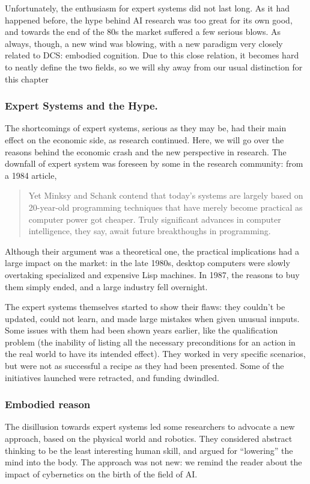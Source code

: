 \documentclass[../main.tex]{subfiles}
\begin{document}
Unfortunately, the enthusiasm for expert systems did not last long. As it had happened before, the hype behind AI research was too great for its own good, and towards the end of the 80s the market suffered a few serious blows. As always, though, a new wind was blowing, with a new paradigm very closely related to DCS: embodied cognition. Due to this close relation, it becomes hard to neatly define the two fields, so we will shy away from our usual distinction for this chapter

\subsubsection{Expert Systems and the Hype.}
The shortcomings of expert systems, serious as they may be, had their main effect on the economic side, as research continued. Here, we will go over the reasons behind the economic crash and the new perspective in research. The downfall of expert system was foreseen by some in the research community: from a 1984 article\cite{universityWhyComputersCan1984},
\begin{quote}
    Yet Minksy and Schank contend that today's systems are largely based on 20-year-old programming techniques that have merely become practical as computer power got cheaper. Truly significant advances in computer intelligence, they say, await future breakthoughs in programming.
\end{quote}

Although their argument was a theoretical one, the practical implications had a large impact on the market: in the late 1980s, desktop computers were slowly overtaking specialized and expensive Lisp machines. In 1987, the reasons to buy them simply ended, and a large industry fell overnight.

The expert systems themselves started to show their flaws: they couldn't be updated, could not learn, and made large mistakes when given unusual innputs. Some issues with them had been shown years earlier, like the qualification problem (the inability of listing all the necessary preconditions for an action in the real world to have its intended effect). They worked in very specific scenarios, but were not as successful a recipe as they had been presented. Some of the initiatives launched were retracted, and funding dwindled\cite{mccorduckMachinesWhoThink2004}.

\subsubsection{Embodied reason}
The disillusion towards expert systems led some researchers to advocate a new approach, based on the physical world and robotics. They considered abstract thinking to be the least interesting human skill, and argued for ``lowering'' the mind into the body. The approach was not new: we remind the reader about the impact of cybernetics on the birth of the field of AI.
\end{document}
